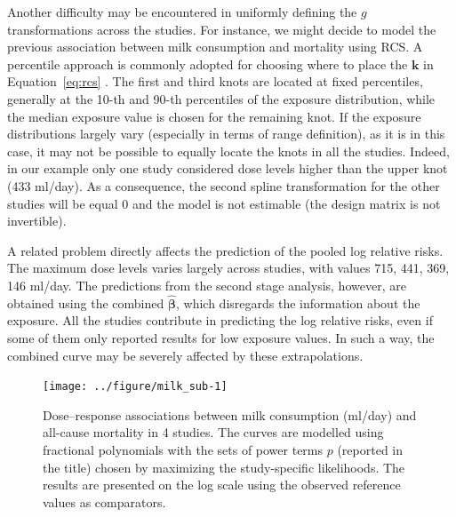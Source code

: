 \documentclass[11pt,a4paper,twoside,openany]{book}\usepackage{knitr}
\begin{document}
{{Another difficulty may be encountered in uniformly defining the $g$ transformations across the studies. For instance, we might decide to model the previous association between milk consumption and mortality using RCS. A percentile approach is commonly adopted for choosing where to place the $\mathbf{k}$ in Equation~\ref{eq:rcs} \citep{harrell2013regression}. The first and third knots are located at fixed percentiles, generally at the 10-th and 90-th percentiles of the exposure distribution, while the median exposure value is chosen for the remaining knot.
If the exposure distributions largely vary (especially in terms of range definition), as it is in this case, it may not be possible to equally locate the knots in all the studies. Indeed, in our example only one study considered dose levels higher than the upper knot (433 ml/day). As a consequence, the second spline transformation for the other studies will be equal 0 and the model is not estimable (the design matrix is not invertible). 

A related problem directly affects the prediction of the pooled log relative risks. The maximum dose levels varies largely across studies, with values 715, 441, 369, 146 ml/day. 
The predictions from the second stage analysis, however, are obtained using the combined $\boldsymbol{\hat \beta}$, which disregards the information about the exposure. All the studies contribute in predicting the log relative risks, even if some of them only reported results for low exposure values. In such a way, the combined curve may be severely affected by these extrapolations.

\begin{knitrout}\footnotesize
{}\color{fgcolor}\begin{figure}[ht!]

{\centering \texttt{[image: ../figure/milk\_sub-1]} 

}

\caption[Dose--response associations between milk consumption (ml/day) and all-cause mortality in 4 studies]{Dose--response associations between milk consumption (ml/day) and all-cause mortality in 4 studies. The curves are modelled using fractional polynomials with the sets of power terms $p$ (reported in the title) chosen by maximizing the study-specific likelihoods. The results are presented on the log scale using the observed reference values as comparators.}\label{fig:milk_sub}
\end{figure}


\end{knitrout}

}}
\end{document}
